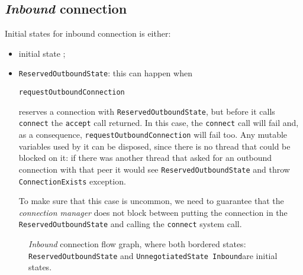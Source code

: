 \documentclass{article}
\def\InitialState{\textbullet}
\def\ReservedOutboundState{\texttt{ReservedOutboundState}}
\def\UnnegotiatedStateIn{\texttt{UnnegotiatedState Inbound}}
\def\DuplexState{\texttt{DuplexState}}
\def\InboundStateUni{\texttt{InboundState Unidirectional}}
\def\InboundStateDup{\texttt{InboundState Duplex}}
\def\connmngr{\textit{connection manager}}
\begin{document}
\subsection{\textit{Inbound} connection}
Initial states for inbound connection is either:
\begin{itemize}
  \item initial state \InitialState{};
  \item \ReservedOutboundState{}:
    this can happen when
    \begin{center}
      \texttt{requestOutboundConnection}
    \end{center}
    reserves a connection with \ReservedOutboundState{}, but before it calls
    \texttt{connect} the \texttt{accept} call returned.  In this case, the
    \texttt{connect} call will fail and, as a consequence,
    \texttt{requestOutboundConnection} will fail too.  Any mutable variables
    used by it can be disposed, since there is no thread that could be blocked
    on it: if there was another thread that asked for an outbound connection
    with that peer it would see \ReservedOutboundState{} and throw
    \texttt{ConnectionExists} exception.

    To make sure that this case is uncommon, we need to guarantee that the
    \connmngr{} does not block between putting the connection in the
    \ReservedOutboundState{} and calling the \texttt{connect} system call.
\end{itemize}

\begin{figure}[h]
  \footnotesize{}
  \caption{\textit{Inbound} connection flow graph, where both bordered states:
  \ReservedOutboundState{} and \UnnegotiatedStateIn are initial states.}
\end{figure}
\end{document}
